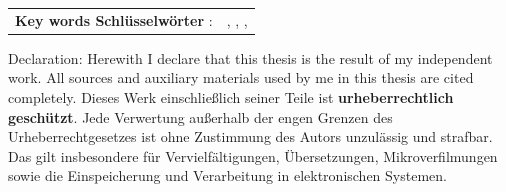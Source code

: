 \begin{titlepage}
\begin{center}
\begin{table}[htbp]
	\begin{tabular}{ll}
		\textbf{\ifx \textLanguage\eng Key words \else Schlüsselwörter \fi}:
				& \schlagwortA, \schlagwortB, \schlagwortC, \schlagwortD
	\end{tabular}
\end{table}
\end{center}
\vfill
\singlespacing
\small
\noindent 
\ifx \textLanguage\eng
\small{
Declaration:
Herewith I declare that this thesis is the result of my independent work. All sources and auxiliary materials used by me in this thesis are cited completely.}
\else
\small{
Dieses Werk einschließlich seiner Teile ist \textbf{urheberrechtlich geschützt}. Jede Verwertung außerhalb der engen Grenzen des Urheberrechtgesetzes ist ohne Zustimmung des Autors unzulässig und strafbar. Das gilt insbesondere für Vervielfältigungen, Übersetzungen, Mikroverfilmungen sowie die Einspeicherung und Verarbeitung in elektronischen Systemen.}
\fi
\end{titlepage}
